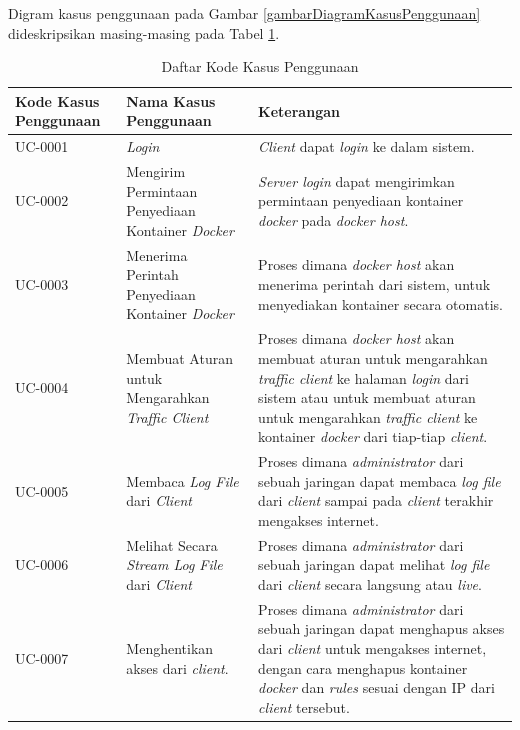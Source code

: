 Digram kasus penggunaan pada Gambar \ref{gambarDiagramKasusPenggunaan} dideskripsikan masing-masing pada Tabel \ref{tabelKodeKasusPenggunaan}.
\begin{longtable}{|p{}|p{}|p{}|} %
	
	\caption{Daftar Kode Kasus Penggunaan} \label{tabelKodeKasusPenggunaan} \\
	\hline
	\textbf{Kode Kasus Penggunaan} & \textbf{Nama Kasus Penggunaan} & \textbf{Keterangan} \\ \hline
	
	\endhead
	\endfoot
	\endlastfoot
	
	UC-0001 & \textit{Login} & \textit{Client} dapat \textit{login} ke dalam sistem. \\ \hline
	UC-0002 & Mengirim Permintaan Penyediaan Kontainer \textit{Docker} & \textit{Server login} dapat mengirimkan permintaan penyediaan kontainer \textit{docker} pada \textit{docker host}. \\ \hline
	UC-0003 & Menerima Perintah Penyediaan Kontainer \textit{Docker}  &  Proses dimana \textit{docker host} akan menerima perintah dari sistem, untuk menyediakan kontainer secara otomatis.\\ \hline
	UC-0004 & Membuat Aturan untuk Mengarahkan \textit{Traffic Client}  &  Proses dimana \textit{docker host} akan membuat aturan untuk mengarahkan \textit{traffic client} ke halaman \textit{login} dari sistem atau untuk membuat aturan untuk mengarahkan \textit{traffic client} ke kontainer \textit{docker} dari tiap-tiap \textit{client}. \\ \hline
	UC-0005 & Membaca \textit{Log File} dari \textit{Client}  &  Proses dimana \textit{administrator} dari sebuah jaringan dapat membaca \textit{log file} dari \textit{client} sampai pada \textit{client} terakhir mengakses internet.\\ \hline
	UC-0006 & Melihat Secara \textit{Stream Log File} dari \textit{Client}  &  Proses dimana \textit{administrator} dari sebuah jaringan dapat melihat \textit{log file} dari \textit{client} secara langsung atau \textit{live}.\\ \hline
	UC-0007 & Menghentikan akses dari \textit{client}.  &  Proses dimana \textit{administrator} dari sebuah jaringan dapat menghapus akses dari \textit{client} untuk mengakses internet, dengan cara menghapus kontainer \textit{docker} dan \textit{rules} sesuai dengan IP dari \textit{client} tersebut.\\ \hline
\end{longtable}

